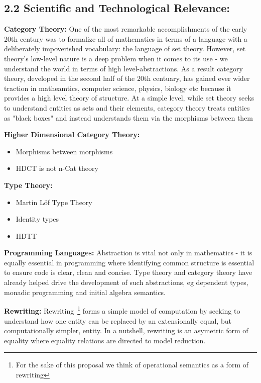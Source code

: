 \documentclass[a4paper,10pt]{article}
\newcommand{\gap}{\protect{\hspace*{0.5em}}}
\begin{document}
\subsection*{2.2 \gap Scientific and Technological Relevance:} 

{\bf Category Theory:} One of the most remarkable accomplishments of
the early 20th century was to formalize all of mathematics in terms of
a language with a deliberately impoverished vocabulary: the language
of set theory. However, set theory's low-level nature is a deep
problem when it comes to its use - we understand the world in terms of
high level-abstractions. As a result category theory, developed in the
second half of the 20th centuary, has gained ever wider traction in
matheamtics, computer science, physics, biology etc because it
provides a high level theory of structure. At a simple level, while
set theory seeks to understand entities as sets and their elements,
category theory treats entities as "black boxes" and instead
understands them via the morphisms between them

{\bf Higher Dimensional Category Theory:}

\begin{itemize}
\item Morphisms between morphisms
\item HDCT is not n-Cat theory
\end{itemize}

{\bf Type Theory:} 
\begin{itemize}
\item Martin L\"of Type Theory
\item Identity types
\item HDTT
\end{itemize}

{\bf Programming Languages:} Abstraction is vital not only in mathematics - it
is equally essential in programming where identifying common structure
is essential to ensure code is clear, clean and concise. Type theory
and category theory have already helped drive the development of such
abstractions, eg dependent types, monadic programming and initial
algebra semantics.

{\bf Rewriting:} Rewriting~\footnote{For the sake of this proposal we
  think of operational semantics as a form of rewriting} forms a
simple model of computation by seeking to understand how one entity
can be replaced by an extensionally equal, but computationally
simpler, entity. In a nutshell, rewriting is an asymetric form of
equality where equality relations are directed to model reduction.
\end{document}
